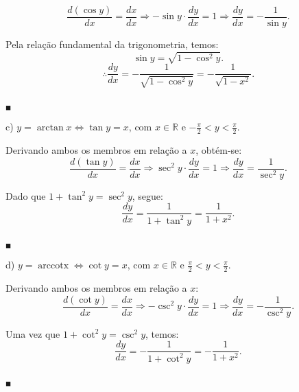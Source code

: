 \documentclass{article}
\begin{document}
{\begin{newpage}
\begin{equation*} \displaystyle{\frac{d(\cos{y})}{dx} = \frac{dx}{dx} \Rightarrow -\sin{y}\cdot\frac{dy}{dx} = 1 \Rightarrow \frac{dy}{dx} = -\frac{1}{\sin{y}}}.\end{equation*}
\par Pela relação fundamental da trigonometria, temos:
\begin{equation*} \sin{y} = \sqrt{1-\cos^{2}{y}}.\end{equation*}
$$\therefore \displaystyle{\frac{dy}{dx} = -\frac{1}{\sqrt{1 - \cos^{2}{y}}} = -\frac{1}{\sqrt{1 - x^2}}}.$$\begin{flushright} $_{\blacksquare }$ \end{flushright}
\par
\vspace{0.3cm}
c) $y=\arctan{x} \Leftrightarrow \tan{y} = x$, com $x\in\mathbb{R}$ e $\displaystyle{-\frac{\pi }{2}<y<\frac{\pi }{2}}$.
\par Derivando ambos os membros em relação a $x$, obtém-se:
\begin{equation*} \displaystyle{\frac{d(\tan{y})}{dx} = \frac{dx}{dx} \Rightarrow \sec^{2}{y}\cdot\frac{dy}{dx} = 1 \Rightarrow \frac{dy}{dx} = \frac{1}{\sec^{2}{y}}}. \end{equation*}
\par Dado que $1 + \tan^{2}{y} = \sec^{2}{y}$, segue:
$$\displaystyle{\frac{dy}{dx} = \frac{1}{1 + \tan^{2}{y}} = \frac{1}{1 + x^2}}.$$\begin{flushright} $_{\blacksquare }$ \end{flushright}
\par
\vspace{0.3cm}
d) $y = \operatorname{arccot{x}} \Leftrightarrow \cot{y} = x$, com $x\in\mathbb{R}$ e $\displaystyle{\frac{\pi }{2}<y<\frac{\pi }{2}}$.
\par Derivando ambos os membros em relação a $x$:
\begin{equation*}\displaystyle{\frac{d(\cot{y})}{dx} = \frac{dx}{dx} \Rightarrow -\csc^{2}{y}\cdot\frac{dy}{dx} = 1 \Rightarrow \frac{dy}{dx} = -\frac{1}{\csc^{2}{y}}}.\end{equation*}
\par Uma vez que $1 + \cot^{2}{y} = \csc^{2}{y}$, temos:
$$\displaystyle{\frac{dy}{dx} = -\frac{1}{1 + \cot^{2}{y}} = -\frac{1}{1+x^2}}.$$\begin{flushright} $_{\blacksquare }$ \end{flushright}
\par
\vspace{0.3cm}

\end{newpage}}
\end{document}
